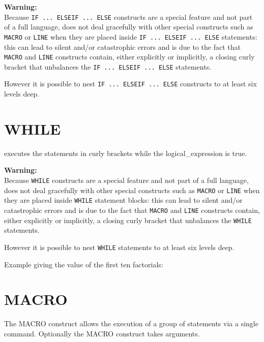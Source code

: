 \textbf{Warning:}\\
Because \texttt{IF ... ELSEIF ... ELSE} constructs are a \madx special
feature and not part of a full language, \madx does not deal gracefully
with other special constructs such as \texttt{MACRO} or \texttt{LINE}
when they are placed  inside \texttt{IF ... ELSEIF ... ELSE} statements:
this can lead to silent and/or catastrophic errors and is due to the
fact that \texttt{MACRO} and \texttt{LINE} constructs contain, 
either explicitly or implicitly, a closing curly bracket that unbalances
the \texttt{IF ... ELSEIF ... ELSE} statements.

However it is possible to nest \texttt{IF ... ELSEIF ... ELSE}
constructs to at least six levels deep.

\section{WHILE}
\label{sec:while}
executes the statements in curly brackets while the logical\_expression
is true. 



\textbf{Warning:}\\
Because \texttt{WHILE} constructs are a \madx special
feature and not part of a full language, \madx does not deal gracefully
with other special constructs such as \texttt{MACRO} or \texttt{LINE}
when they are placed inside \texttt{WHILE} statement blocks: this can
lead to silent and/or catastrophic errors and is due to the fact that
\texttt{MACRO} and \texttt{LINE} constructs contain, either explicitly or  
implicitly, a closing curly bracket that unbalances the \texttt{WHILE}
statements. 

However it is possible to nest \texttt{WHILE} statements to at least six
levels deep. 

Example giving the value of the first ten factorials:

\section{MACRO}
\label{sec:macro}

The MACRO construct allows the execution of a group of statements via a
single command. Optionally the MACRO construct takes arguments.

